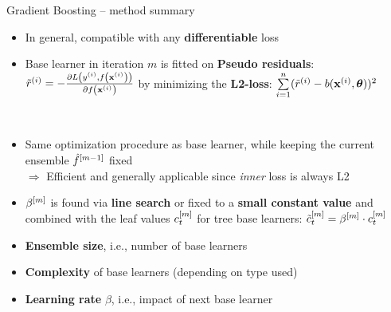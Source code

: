 \begin{frame}{Gradient Boosting -- method summary}

\footnotesize


\begin{itemize}
  \item In general, compatible with any \textbf{differentiable} loss
  \item Base learner in iteration $m$ is fitted on \textbf{Pseudo residuals}: \\
  $\tilde{r}^{(i)} = - \frac{\partial{L\left(y^{(i)}, f\left(\mathbf{x}^{(i)}\right)\right)}}{\partial f\left(\mathbf{x}^{(i)}\right)}$ by minimizing the \textbf{L2-loss}: $\sum\limits_{i=1}^n (\tilde{r}^{(i)} - b(\mathbf{x}^{(i)}, \bm{\theta}))^2$
\end{itemize}

\medskip

 ~~
\begin{itemize}
    \item Same optimization procedure as base learner, while keeping the current ensemble $\hat{f}^{[m-1]}$ fixed\\
    $\Rightarrow$ Efficient and generally applicable since \textit{inner} loss is always L2
    \item $\beta^{[m]}$ is found via \textbf{line search} or fixed to a \textbf{small constant value} and combined with the leaf values $c_t^{[m]}$ for tree base learners: $\tilde{c}_t^{[m]} = \beta^{[m]} \cdot c_t^{[m]}$
\end{itemize}

\medskip


\begin{itemize}
  \item \textbf{Ensemble size}, i.e., number of base learners
  \item \textbf{Complexity} of base learners (depending on type used)
  \item \textbf{Learning rate} $\beta$, i.e., impact of next base learner
\end{itemize}

\medskip


\end{frame}



